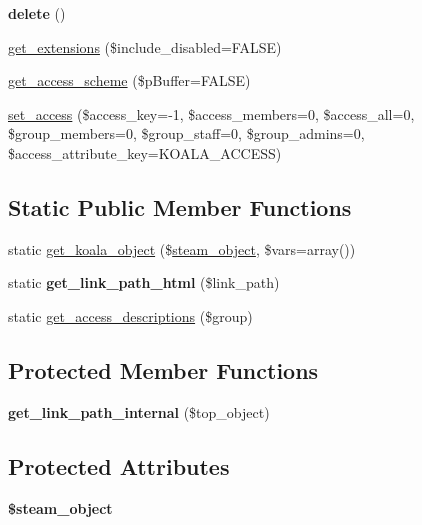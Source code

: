 \begin{DoxyCompactItemize}
\item 
\hypertarget{classkoala__object_a2c57b8aa225ae3a96367b71e1d0fdbe1}{
{\bfseries delete} ()}
\label{classkoala__object_a2c57b8aa225ae3a96367b71e1d0fdbe1}

\item 
\hyperlink{classkoala__object_a2b4e1421a85e83b06867b9846588f7d1}{get\_\-extensions} (\$include\_\-disabled=FALSE)
\item 
\hyperlink{classkoala__object_a7b976c8bbd19e11b43c8861940cd085f}{get\_\-access\_\-scheme} (\$pBuffer=FALSE)
\item 
\hyperlink{classkoala__object_a50dc02b01b08ef09259b48994bd9849d}{set\_\-access} (\$access\_\-key=-\/1, \$access\_\-members=0, \$access\_\-all=0, \$group\_\-members=0, \$group\_\-staff=0, \$group\_\-admins=0, \$access\_\-attribute\_\-key=KOALA\_\-ACCESS)
\end{DoxyCompactItemize}
\subsection*{Static Public Member Functions}
\begin{DoxyCompactItemize}
\item 
static \hyperlink{classkoala__object_a53cbad80e4d1847c8a5d44878b133dda}{get\_\-koala\_\-object} (\$\hyperlink{classsteam__object}{steam\_\-object}, \$vars=array())
\item 
\hypertarget{classkoala__object_a2a1911c61373ca23c477ddfc772caa5e}{
static {\bfseries get\_\-link\_\-path\_\-html} (\$link\_\-path)}
\label{classkoala__object_a2a1911c61373ca23c477ddfc772caa5e}

\item 
static \hyperlink{classkoala__object_a9acee0cf757c2316ebd7aed89867ae0d}{get\_\-access\_\-descriptions} (\$group)
\end{DoxyCompactItemize}
\subsection*{Protected Member Functions}
\begin{DoxyCompactItemize}
\item 
\hypertarget{classkoala__object_a5991db87b166df6a24f192da1202ce45}{
{\bfseries get\_\-link\_\-path\_\-internal} (\$top\_\-object)}
\label{classkoala__object_a5991db87b166df6a24f192da1202ce45}

\end{DoxyCompactItemize}
\subsection*{Protected Attributes}
\begin{DoxyCompactItemize}
\item 
\hypertarget{classkoala__object_a27ca1cb2e9c75ffec2b4aef7d3338fce}{
{\bfseries \$steam\_\-object}}
\label{classkoala__object_a27ca1cb2e9c75ffec2b4aef7d3338fce}

\end{DoxyCompactItemize}


